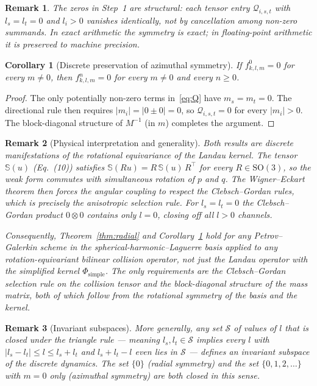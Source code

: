 \documentclass[11pt, a4paper]{article}
\newtheorem{corollary}[theorem]{Corollary}
\newtheorem*{remark}{Remark}
\begin{document}
\begin{remark}
The zeros in Step~1 are \emph{structural}: each tensor entry
$\mathcal{Q}_{i,s,t}$ with $l_s = l_t = 0$ and $l_i > 0$ vanishes
identically, not by cancellation among non-zero summands.  In exact
arithmetic the symmetry is exact; in floating-point arithmetic it is
preserved to machine precision.
\end{remark}

\begin{corollary}[Discrete preservation of azimuthal symmetry]\label{cor:azimuthal}
If $f^0_{k,l,m} = 0$ for every $m \neq 0$, then $f^n_{k,l,m} = 0$ for
every $m \neq 0$ and every $n \geq 0$.
\end{corollary}

\begin{proof}
The only potentially non-zero terms in~\eqref{eq:Q} have $m_s = m_t = 0$.
The directional rule then requires $|m_i| = |0 \pm 0| = 0$, so
$\mathcal{Q}_{i,s,t} = 0$ for every $|m_i| > 0$.  The block-diagonal
structure of $M^{-1}$ (in $m$) completes the argument.
\end{proof}

\begin{remark}[Physical interpretation and generality]
Both results are discrete manifestations of the rotational equivariance of
the Landau kernel.  The tensor $\mathbb{S}(u)$ (Eq.~(10)) satisfies
$\mathbb{S}(Ru) = R\,\mathbb{S}(u)\,R^\top$ for every $R \in \mathrm{SO}(3)$,
so the weak form commutes with simultaneous rotation of $p$ and $q$.  The
Wigner--Eckart theorem then forces the angular coupling to respect the
Clebsch--Gordan rules, which is precisely the anisotropic selection rule.
For $l_s = l_t = 0$ the Clebsch--Gordan product $0 \otimes 0$ contains only
$l = 0$, closing off all $l > 0$ channels.

Consequently, Theorem~\ref{thm:radial} and Corollary~\ref{cor:azimuthal}
hold for \emph{any} Petrov--Galerkin scheme in the spherical-harmonic--Laguerre
basis applied to any rotation-equivariant bilinear collision operator, not
just the Landau operator with the simplified kernel $\Phi_{\mathrm{simple}}$.
The only requirements are the Clebsch--Gordan selection rule on the collision
tensor and the block-diagonal structure of the mass matrix, both of which
follow from the rotational symmetry of the basis and the kernel.
\end{remark}

\begin{remark}[Invariant subspaces]
More generally, any set $\mathcal{S}$ of values of $l$ that is
\emph{closed under the triangle rule} --- meaning $l_s, l_t \in \mathcal{S}$
implies every $l$ with $|l_s - l_t| \leq l \leq l_s + l_t$ and
$l_s + l_t - l$ even lies in $\mathcal{S}$ --- defines an invariant subspace
of the discrete dynamics.  The set $\{0\}$ (radial symmetry) and the set
$\{0, 1, 2, \ldots\}$ with $m = 0$ only (azimuthal symmetry) are both closed
in this sense.
\end{remark}
\end{document}
